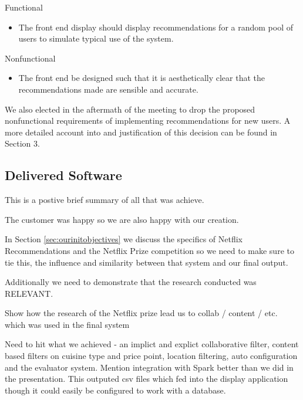 \documentclass{l3proj}
\begin{document}
Functional
\begin{itemize}
\item The front end display should display recommendations for a random pool of users to simulate typical use of the system.
\end{itemize}

Nonfunctional
\begin{itemize}
\item The front end be designed such that it is aesthetically clear that the recommendations made are sensible and accurate.
\end{itemize}

We also elected in the aftermath of the meeting to drop the proposed nonfunctional requirements of implementing recommendations for new users. A more detailed account into and justification of this decision can be found in Section 3.

\subsection{Delivered Software}
\label{sec:finsoftware}


This is a postive brief summary of all that was achieve.

The customer was happy so we are also happy with our creation.

In Section \ref{sec:ourinitobjectives} we discuss the specifics of Netflix Recommendations and the Netflix Prize competition so we need to make sure to tie this, the influence and similarity between that system and our final output. 

Additionally we need to demonstrate that the research conducted was RELEVANT.

Show how the research of the Netflix prize lead us to collab / content / etc. which was used in the final system

Need to hit what we achieved - an implict and explict collaborative filter, content based filters on cuisine type and price point, location filtering, auto configuration and the evaluator system. Mention integration with Spark better than we did in the presentation. This outputed csv files which fed into the display application though it could easily be configured to work with a database. 
\end{document}
